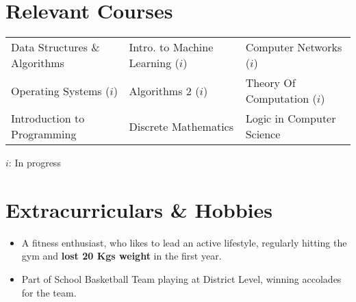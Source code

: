 \documentclass[letterpaper,10pt]{article}
\newcommand{\resumeSubHeadingListStart}{\begin{itemize}[leftmargin=*]}
\newcommand{\resumeSubHeadingListEnd}{\end{itemize}}
\begin{document}
\section{Relevant Courses}
{\fontsize{10pt}{1em}\bodyfontlight\upshape\color{black}
	\begin{tabular*}{\textwidth}{l l l}
		Data Structures \& Algorithms 
		& \hspace{6em} Intro. to Machine Learning ($i$) 
		& \hspace{6em} Computer Networks ($i$)
		\\
		Operating Systems ($i$)
		&\hspace{6em} Algorithms 2 ($i$)
		&\hspace{6em} Theory Of Computation ($i$)
		\\
		Introduction to Programming &\hspace{6em} 
		Discrete Mathematics   &\hspace{6em} 
		Logic in Computer Science  \vspace{0pt}
	\end{tabular*}
}
\hspace*{\fill} 
		$i$: In progress\\

\vspace{-0.6cm}
\section{Extracurriculars \& Hobbies}
\begin{itemize}[noitemsep]
	  \item \fontsize{10pt}{1em}A fitness enthusiast, who likes to lead an active lifestyle, regularly hitting the gym and \textbf{lost 20 Kgs weight} in the first year. 
	  \item Part of School Basketball Team playing at District Level, winning accolades for the team.
\end{itemize}

%


\end{document}
